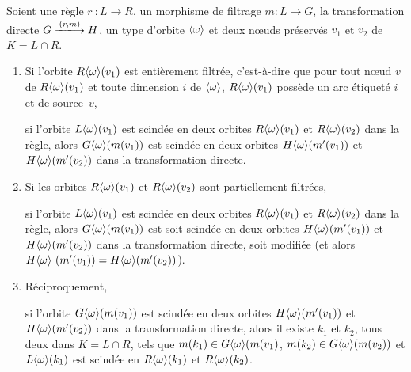 \begin{proposition}
	\label{prop:base-rule_split}
	Soient une règle $r~: L \longrightarrow R$, un morphisme de filtrage $m : L \rightarrow G$, la
	transformation directe $G \xlongrightarrow{(r,m)} H$, un type d'orbite
	$\langle\omega\rangle$ et deux n\oe uds préservés $v_1$ et $v_2$ de $K = L \cap R$.

	\begin{enumerate}
		\item Si l'orbite $R\langle\omega\rangle(v_1)$ est entièrement filtrée, c'est-à-dire que pour tout n\oe ud $v$ de $R\langle\omega\rangle(v_1)$ et toute dimension $i$ de $\langle\omega\rangle$, $R\langle\omega\rangle(v_1)$ possède un arc étiqueté  $i$ et de source~$v$,

		      si l'orbite $L\langle\omega\rangle(v_1)$ est scindée en deux orbites $R\langle\omega\rangle(v_1)$ et $R\langle\omega\rangle(v_2)$ dans la règle, alors $G\langle\omega\rangle(m(v_1))$ est scindée en deux orbites $H\langle\omega\rangle(m'(v_1))$ et $H\langle\omega\rangle(m'(v_2))$ dans la transformation directe.

		\item Si les orbites $R\langle\omega\rangle(v_1)$ et $R\langle\omega\rangle(v_2)$ sont partiellement filtrées,

		      si l'orbite $L\langle\omega\rangle(v_1)$ est scindée en deux orbites $R\langle\omega\rangle(v_1)$ et $R\langle\omega\rangle(v_2)$ dans la règle, alors $G\langle\omega\rangle(m(v_1))$ est soit scindée en deux orbites $H\langle\omega\rangle(m'(v_1))$ et $H\langle\omega\rangle(m'(v_2))$ dans la transformation directe, soit modifiée (et alors $H\langle\omega\rangle~(m'(v_1)) = H\langle\omega\rangle(m'(v_2))$).

		\item Réciproquement,

		      si l'orbite $G\langle\omega\rangle(m(v_1))$ est scindée en deux orbites $H\langle\omega\rangle(m'(v_1))$ et $H\langle\omega\rangle(m'(v_2))$ dans la transformation directe, alors il existe $k_1$ et $k_2$, tous deux dans $K = L \cap R$, tels que $m(k_1) \in G\langle\omega\rangle(m(v_1)$, $m(k_2) \in G\langle\omega\rangle(m(v_2))$ et $L\langle\omega\rangle(k_1)$ est scindée en $R\langle\omega\rangle(k_1)$ et $R\langle\omega\rangle(k_2)$. %


	\end{enumerate}
\end{proposition}

